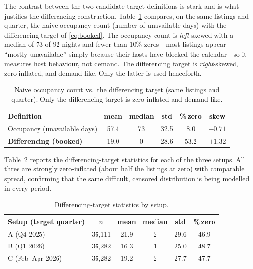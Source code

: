 \documentclass[journal]{IEEEtran}
\begin{document}
The contrast between the two candidate target definitions is stark and is what
justifies the differencing construction. Table~\ref{tab:targetdef} compares, on
the same listings and quarter, the naive occupancy count (number of unavailable
days) with the differencing target of \eqref{eq:booked}. The occupancy count is
\emph{left}-skewed with a median of $73$ of $92$ nights and fewer than $10\%$
zeros---most listings appear ``mostly unavailable'' simply because their hosts
have blocked the calendar---so it measures host behaviour, not demand. The
differencing target is \emph{right}-skewed, zero-inflated, and demand-like. Only
the latter is used henceforth.

\begin{table}[!t]
\caption{Naive occupancy count vs.\ the differencing target (same listings and
quarter). Only the differencing target is zero-inflated and demand-like.}
\label{tab:targetdef}
\centering
\small
\begin{tabular}{lccccc}
\toprule
Definition & mean & median & std & \%\,zero & skew \\
\midrule
Occupancy (unavailable days) & 57.4 & 73 & 32.5 & 8.0 & $-0.71$ \\
\textbf{Differencing (booked)} & 19.0 & 0 & 28.6 & 53.2 & $+1.32$ \\
\bottomrule
\end{tabular}
\end{table}

Table~\ref{tab:targetstats} reports the differencing-target statistics for each of
the three setups. All three are strongly zero-inflated (about half the listings at
zero) with comparable spread, confirming that the same difficult, censored
distribution is being modelled in every period.

\begin{table}[!t]
\caption{Differencing-target statistics by setup.}
\label{tab:targetstats}
\centering
\small
\begin{tabular}{lccccc}
\toprule
Setup (target quarter) & $n$ & mean & median & std & \%\,zero \\
\midrule
A (Q4 2025) & 36,111 & 21.9 & 2 & 29.6 & 46.9 \\
B (Q1 2026) & 36,282 & 16.3 & 1 & 25.0 & 48.7 \\
C (Feb--Apr 2026) & 36,282 & 19.2 & 2 & 27.7 & 47.7 \\
\bottomrule
\end{tabular}
\end{table}
\end{document}
